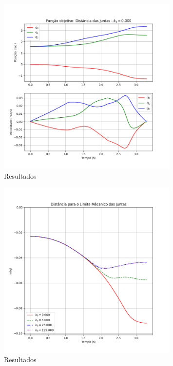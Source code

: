\begin{figure}
    \centering
    \includegraphics[width=0.8\textwidth]{Images/joint_limit/k0=0.png}
    \caption{Resultados}\label{fig:jlim-k0-0}
\end{figure}

\begin{figure}
    \centering
    \includegraphics[width=0.8\textwidth]{Images/joint_limit/joint_limit.png}
    \caption{Resultados}\label{fig:jlim}
\end{figure}
